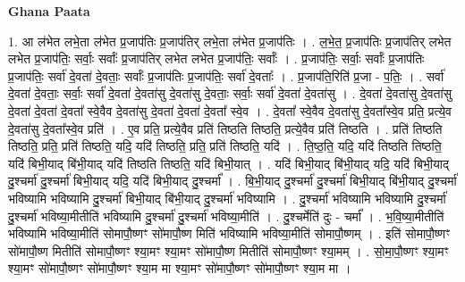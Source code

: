 \documentclass[17pt]{extarticle}
\begin{document}
\textbf{Ghana Paata } \newline

1. आ ल॑भेत लभे॒ता ल॑भेत प्र॒जाप॑तिः प्र॒जाप॑तिर् लभे॒ता ल॑भेत प्र॒जाप॑तिः । . ल॒भे॒त॒ प्र॒जाप॑तिः प्र॒जाप॑तिर् लभेत लभेत प्र॒जाप॑तिः॒ सर्वाः॒ सर्वाः᳚ प्र॒जाप॑तिर् लभेत लभेत प्र॒जाप॑तिः॒ सर्वाः᳚ । . प्र॒जाप॑तिः॒ सर्वाः॒ सर्वाः᳚ प्र॒जाप॑तिः प्र॒जाप॑तिः॒ सर्वा॑ दे॒वता॑ दे॒वताः॒ सर्वाः᳚ प्र॒जाप॑तिः प्र॒जाप॑तिः॒ सर्वा॑ दे॒वताः᳚ । . प्र॒जाप॑ति॒रिति॑ प्र॒जा - प॒तिः॒ । . सर्वा॑ दे॒वता॑ दे॒वताः॒ सर्वाः॒ सर्वा॑ दे॒वता॑ दे॒वता॑सु दे॒वता॑सु दे॒वताः॒ सर्वाः॒ सर्वा॑ दे॒वता॑ दे॒वता॑सु । . दे॒वता॑ दे॒वता॑सु दे॒वता॑सु दे॒वता॑ दे॒वता॑ दे॒वता᳚ स्वे॒वैव दे॒वता॑सु दे॒वता॑ दे॒वता॑ दे॒वता᳚ स्वे॒व । . दे॒वता᳚ स्वे॒वैव दे॒वता॑सु दे॒वता᳚स्वे॒व प्रति॒ प्रत्ये॒व दे॒वता॑सु दे॒वता᳚स्वे॒व प्रति॑ । . ए॒व प्रति॒ प्रत्ये॒वैव प्रति॑ तिष्ठति तिष्ठति॒ प्रत्ये॒वैव प्रति॑ तिष्ठति । . प्रति॑ तिष्ठति तिष्ठति॒ प्रति॒ प्रति॑ तिष्ठति॒ यदि॒ यदि॑ तिष्ठति॒ प्रति॒ प्रति॑ तिष्ठति॒ यदि॑ । . ति॒ष्ठ॒ति॒ यदि॒ यदि॑ तिष्ठति तिष्ठति॒ यदि॑ बिभी॒याद् बि॑भी॒याद् यदि॑ तिष्ठति तिष्ठति॒ यदि॑ बिभी॒यात् । . यदि॑ बिभी॒याद् बि॑भी॒याद् यदि॒ यदि॑ बिभी॒याद् दु॒श्चर्मा॑ दु॒श्चर्मा॑ बिभी॒याद् यदि॒ यदि॑ बिभी॒याद् दु॒श्चर्मा᳚ । . बि॒भी॒याद् दु॒श्चर्मा॑ दु॒श्चर्मा॑ बिभी॒याद् बि॑भी॒याद् दु॒श्चर्मा॑ भविष्यामि भविष्यामि दु॒श्चर्मा॑ बिभी॒याद् बि॑भी॒याद् दु॒श्चर्मा॑ भविष्यामि । . दु॒श्चर्मा॑ भविष्यामि भविष्यामि दु॒श्चर्मा॑ दु॒श्चर्मा॑ भविष्या॒मीतीति॑ भविष्यामि दु॒श्चर्मा॑ दु॒श्चर्मा॑ भविष्या॒मीति॑ । . दु॒श्चर्मेति॑ दुः - चर्मा᳚ । . भ॒वि॒ष्या॒मीतीति॑ भविष्यामि भविष्या॒मीति॑ सोमापौ॒ष्णꣳ सो॑मापौ॒ष्ण मिति॑ भविष्यामि भविष्या॒मीति॑ सोमापौ॒ष्णम् । . इति॑ सोमापौ॒ष्णꣳ सो॑मापौ॒ष्ण मितीति॑ सोमापौ॒ष्णꣳ श्या॒मꣳ श्या॒मꣳ सो॑मापौ॒ष्ण मितीति॑ सोमापौ॒ष्णꣳ श्या॒मम् । . सो॒मा॒पौ॒ष्णꣳ श्या॒मꣳ श्या॒मꣳ सो॑मापौ॒ष्णꣳ सो॑मापौ॒ष्णꣳ श्या॒म मा श्या॒मꣳ सो॑मापौ॒ष्णꣳ सो॑मापौ॒ष्णꣳ श्या॒म मा । \newline
\end{document}

